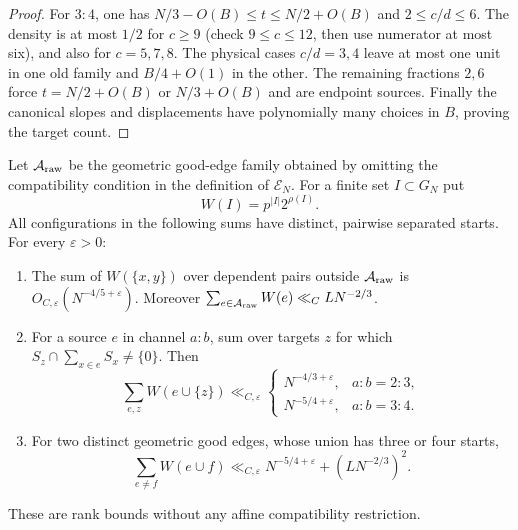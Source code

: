 \begin{proof}
For $3:4$, one has $N/3-O(B)\leq t\leq N/2+O(B)$ and
$2\leq c/d\leq6$.  The density is at most $1/2$ for $c\geq9$
(check $9\leq c\leq12$, then use numerator at most six), and also
for $c=5,7,8$.  The physical cases $c/d=3,4$ leave at most one unit
in one old family and $B/4+O(1)$ in the other.  The remaining fractions
$2,6$ force $t=N/2+O(B)$ or $N/3+O(B)$ and are endpoint sources.
Finally the canonical slopes and displacements have polynomially many
choices in $B$, proving the target count.
\end{proof}

\begin{proposition}
\label{p1:arith:fixed-homogeneous-seeds}
Let $\mathcal A_{\rm raw}$ be the geometric good-edge family obtained by
omitting the compatibility condition in the definition of $\mathcal E_N$.
For a finite set $I\subset G_N$ put
\[
 W(I)=p^{|I|}2^{\rho(I)}.
\]
All configurations in the following sums have distinct, pairwise separated
starts.  For every $\varepsilon>0$:
\begin{enumerate}
\item The sum of $W(\{x,y\})$ over dependent pairs outside
$\mathcal A_{\rm raw}$ is $O_{C,\varepsilon}(N^{-4/5+\varepsilon})$.
Moreover $\sum_{e\in\mathcal A_{\rm raw}}W(e)\ll_C LN^{-2/3}$.
\item For a source $e$ in channel $a:b$, sum over targets $z$ for which
$S_z\cap\sum_{x\in e}S_x\ne\{0\}$.  Then
\[
 \sum_{e,z}W(e\cup\{z\})
 \ll_{C,\varepsilon}
 \begin{cases}N^{-4/3+\varepsilon},&a:b=2:3,\\
               N^{-5/4+\varepsilon},&a:b=3:4.
 \end{cases}
\]
\item For two distinct geometric good edges, whose union has three or
four starts,
\[
 \sum_{e\ne f}W(e\cup f)
 \ll_{C,\varepsilon}N^{-5/4+\varepsilon}+(LN^{-2/3})^2.
\]
\end{enumerate}
These are rank bounds without any affine compatibility restriction.
\end{proposition}


